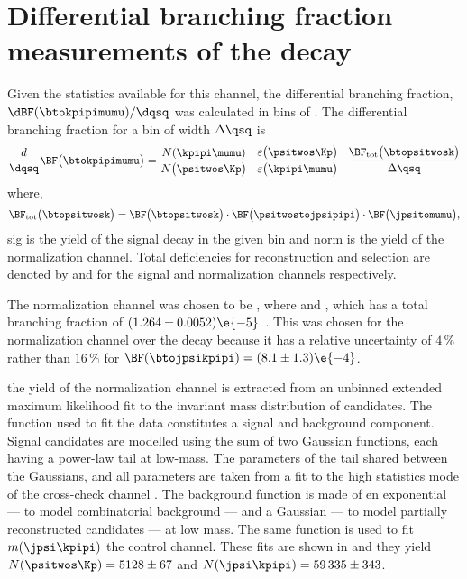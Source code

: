 \section[Differential branching fraction measurements of the decay \btokpipimumu]{
  Differential branching fraction measurements of the decay \tmath{\btokpipimumu}
}

Given the statistics available for this channel, the differential branching fraction,
$\dBF(\btokpipimumu)/\dqsq$ was calculated in bins of \qsq.
The differential branching fraction for a bin of width $\Delta\qsq$ is
\begin{equation}
  \frac{d}{\dqsq}\BF\big(\btokpipimumu\big)
  =
  \frac{N(\kpipi\mumu)}{N\big(\psitwos\Kp\big)} \cdot
  \frac{\varepsilon\big(\psitwos\Kp\big)}{\varepsilon\big(\kpipi\mumu\big)} \cdot
  \frac{\BF_\mathrm{tot}\big(\btopsitwosk\big)}{\Delta\qsq}
  \label{eq:kpipi:diffbf}
\end{equation}
where,
\begin{equation}
  \BF_\mathrm{tot}\big(\btopsitwosk\big)
  =
  \BF\big(\btopsitwosk\big) \cdot
  \BF\big(\psitwostojpsipipi\big) \cdot
  \BF\big(\jpsitomumu\big),
\end{equation}
\num{sig} is the yield of the signal decay \btokpipimumu in the given \qsq bin and \num{norm}
is the yield of the normalization channel.
Total deficiencies for reconstruction and selection are denoted by  and  for the
signal and normalization channels respectively.

The normalization channel was chosen to be \btopsitwosk, where \psitwostojpsipipi and \jpsitomumu,
which has a total branching fraction of $(1.264 \pm 0.0052)\e{-5}$~\cite{PDG2012}.
This was chosen for the normalization channel over the decay \btojpsikpipi because it has a
relative uncertainty of $4\,\%$ rather than $16\,\%$ for $\BF(\btojpsikpipi) = (8.1\pm1.3)\e{-4}$.

the yield  of the normalization channel is extracted from an unbinned extended maximum likelihood
fit to the invariant mass distribution of \btopsitwosk candidates.
The function used to fit the data constitutes a signal and background component.
Signal candidates are modelled using the sum of two Gaussian functions, each having a power-law
tail at low-mass.
The parameters of the tail shared between the Gaussians, and all parameters are taken from a fit to
the high statistics mode of the cross-check channel \btojpsikpipi.
The background function is made of en exponential --- to model combinatorial background --- and a
Gaussian --- to model partially reconstructed candidates --- at low mass.
The same function is used to fit $m(\jpsi\kpipi)$ the control channel.
These fits are shown in  and they yield
$N(\psitwos\Kp)=5128\pm67$ and $N(\jpsi\kpipi)=59\,335\pm343$.

